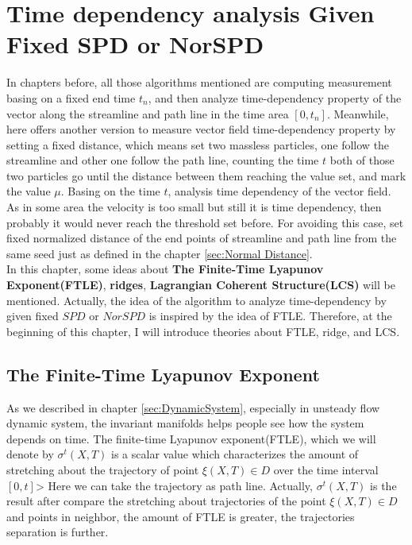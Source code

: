 \documentclass[
     11pt,         %
     a4paper,      %
     oneside,
     ]{article}
\begin{document}
\section{Time dependency analysis Given Fixed SPD or NorSPD}
In chapters before, all those algorithms mentioned are computing measurement basing on a fixed end time $t_{n}$, and then analyze time-dependency property of the vector along the streamline and path line in the time area $[0, t_{n}]$. Meanwhile, here offers another version to measure vector field time-dependency property by setting a fixed distance, which means set two massless particles, one follow the streamline and other one follow the path line, counting the time $t$ both of those two particles go until the distance between them reaching the value set, and mark the value $\mu$. Basing on the time $t$, analysis time dependency of the vector field.\\
As in some area the velocity is too small but still it is time dependency, then probably it would never reach the threshold set before. For avoiding this case, set fixed normalized distance of the end points of streamline and path line from the same seed just as defined in the chapter \ref{sec:Normal Distance}.\\
In this chapter, some ideas about \textbf{The Finite-Time Lyapunov Exponent(FTLE)},\textbf{ ridges}, \textbf{Lagrangian Coherent Structure(LCS)} will be mentioned. Actually, the idea of the algorithm to analyze time-dependency by given fixed $SPD$ or $NorSPD$ is inspired by the idea of FTLE. Therefore, at the beginning of this chapter, I will introduce theories about FTLE, ridge, and LCS.
\subsection{The Finite-Time Lyapunov Exponent}
As we described in chapter \ref{sec:DynamicSystem}, especially in unsteady flow dynamic system, the invariant manifolds helps people see how the system depends on time. The finite-time Lyapunov exponent(FTLE), which we will denote by $\sigma^{t}(X,T)$ is a scalar value which characterizes the amount of stretching about the trajectory of point $\xi(X,T)\in D$ over the time interval $[0, t]$> Here we can take the trajectory as path line. Actually, $\sigma^{t}(X,T)$ is the result after compare the stretching about trajectories of the point $\xi(X,T)\in D$  and points in neighbor, the amount of FTLE is greater, the trajectories separation is further.\\
\end{document}

